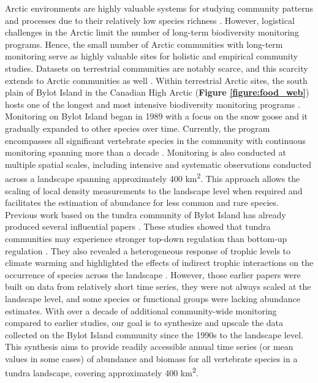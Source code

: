 \documentclass[a4paper,twoside,12pt]{article}
\begin{document}
Arctic environments are highly valuable systems for studying community patterns and processes due to their relatively low species richness \citep{payer2013, legagneux2014}. However, logistical challenges in the Arctic limit the number of long-term biodiversity monitoring programs. Hence, the small number of Arctic communities with long-term monitoring serve as highly valuable sites for holistic and empirical community studies. Datasets on terrestrial communities are notably scarce, and this scarcity extends to Arctic communities as well \citep{ims2013}. 
Within terrestrial Arctic sites, the south plain of Bylot Island in the Canadian High Arctic (\textbf{Figure \ref{figure:food_web}}) hosts one of the longest and most intensive biodiversity monitoring programs \citep{gauthier2024a}. Monitoring on Bylot Island began in 1989 with a focus on the snow goose and it gradually expanded to other species over time. Currently, the program encompasses all significant vertebrate species in the community with continuous monitoring spanning more than a decade \citep{gauthier2024a}. Monitoring is also conducted at multiple spatial scales, including intensive and systematic observations conducted across a landscape spanning approximately 400 km\textsuperscript{2}. This approach allows the scaling of local density measurements to the landscape level when required and facilitates the estimation of abundance for less common and rare species. 
Previous work based on the tundra community of Bylot Island  has already produced several influential papers \citep{gauthier2011, legagneux2012, legagneux2014,hutchison2020, duchesne2021, gauthier2024b}. These studies showed that tundra communities may experience stronger top-down regulation than bottom-up regulation \citep{legagneux2012, legagneux2014}. They also revealed a heterogeneous response of trophic levels to climate warming \citep{gauthier2013} and highlighted the effects of indirect trophic interactions on the occurrence of species across the landscape \citep{duchesne2021}. However, those earlier papers were built on data from relatively short time series, they were not always scaled at the landscape level, and some species or functional groups were lacking abundance estimates. With over a decade of additional community-wide monitoring compared to earlier studies, our goal is to synthesize and upscale the data collected on the Bylot Island community since the 1990s to the landscape level. This synthesis aims to provide readily accessible annual time series (or mean values in some cases) of abundance and biomass for all vertebrate species in a tundra landscape, covering approximately 400 km\textsuperscript{2}. 
\end{document}
